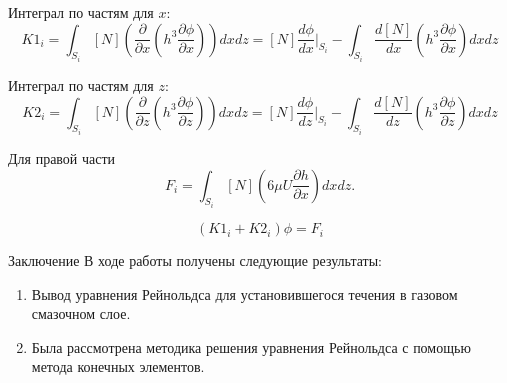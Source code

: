 \documentclass[ignoreonframetext,unicode]{beamer}
\begin{document}
\begin{frame}{}
Интеграл по частям для $x$:
		\[
		K1_i = \int_{S_i} {[N] \left(\frac{\partial}{\partial x} \left(h^3 \frac{\partial \phi}{\partial x} \right)\right) dx dz} = [N]\frac{d \phi}{dx}\Biggr|_{S_i} - \int_{S_i} {\frac{d[N]}{dx} \left(h^3 \frac{\partial \phi}{\partial x} \right) dx dz}
		\]

Интеграл по частям для $z$:
	\[
	K2_i = \int_{S_i} {[N] \left(\frac{\partial}{\partial z} \left(h^3 \frac{\partial \phi}{\partial z} \right)\right) dx dz} = [N]\frac{d \phi}{dz}\Biggr|_{S_i} - \int_{S_i} {\frac{d[N]}{dz} \left(h^3 \frac{\partial \phi}{\partial z} \right) dx dz}
	\]

\begin{block}{Для правой части}
	\[
	F_i = \int_{S_i} [N]\left(6 \mu U \frac{\partial h}{\partial x}\right) dx dz.
	\]
\end{block}

\[
(K1_i + K2_i )\phi = F_i
\]
	
	
\end{frame}

\begin{frame}{Заключение}
	В ходе работы получены следующие результаты:
	\begin{block}{}
	\begin{enumerate}	
		\item Вывод уравнения Рейнольдса для установившегося течения в газовом смазочном слое.
		\item Была рассмотрена методика решения уравнения Рейнольдса с помощью метода конечных элементов.
	\end{enumerate}
	\end{block}	
\end{frame}	
\end{document}
